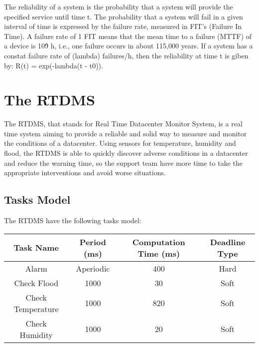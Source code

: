 \documentclass[12pt]{article}
\begin{document}
The reliability of a system is the probability that a system will provide the specified service until time t.
The probability that a system will fail in a given interval of time is expressed by the failure rate, 
measured in FIT's (Failure In Time). A failure rate of 1 FIT means that the mean time to a failure (MTTF) 
of a device is 10\^9 h, i.e., one failure occurs in about 115,000 years.
If a system has a constat failure rate of (lambda) failures/h, then the reliability at time t is giben by:
R(t) = exp(-lambda(t - t0)). \cite{kopetz2011real}

\fi

\section{The RTDMS}

The RTDMS, that stands for Real Time Datacenter Monitor System, is a real time system aiming
to provide a reliable and solid way to measure and monitor the conditions of a datacenter. Using
sensors for temperature, humidity and flood, the RTDMS is able to quickly discover adverse conditions
in a datacenter and reduce the warning time, so the support team have more time to take the
appropriate interventions and avoid worse situations.

\subsection{Tasks Model}
The RTDMS have the following tasks model:

\begin{table}
    \begin{tabular}{|c|c|c|c|}
        \hline
        \textbf{Task Name}& \textbf{Period (ms)}& \textbf{Computation Time (ms)}& \textbf{Deadline Type} \\ \hline
        Alarm             & Aperiodic   & 400                   & Hard          \\ \hline
        Check Flood       & 1000        & 30                    & Soft          \\ \hline
        Check Temperature & 1000        & 820                   & Soft          \\ \hline
        Check Humidity    & 1000        & 20                    & Soft          \\
        \hline
    \end{tabular}
\end{table}
\end{document}
